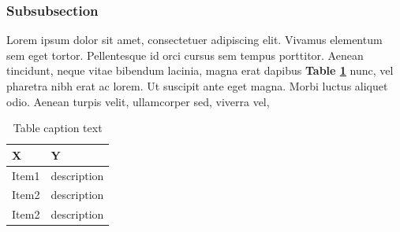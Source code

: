 \subsubsection{Subsubsection}
Lorem ipsum dolor sit amet, consectetuer adipiscing elit. Vivamus elementum sem eget tortor. Pellentesque id orci cursus sem tempus porttitor. Aenean tincidunt, neque vitae bibendum lacinia, magna erat dapibus \textbf{Table \ref{tab:table}} nunc, vel pharetra nibh erat ac lorem. Ut suscipit ante eget magna. Morbi luctus aliquet odio. Aenean turpis velit, ullamcorper sed, viverra vel, 

 \begin{table} [t] 
\centering
\begin{small}
\caption{Table caption text}
\label{tab:table}
\setlength{\tabcolsep}{1em}
\begin{tabular}{ l| p{8cm}}
\hline
 \textbf{X} & \textbf{ Y} \\
\hline
 \hline	
 Item1 & description\\
 \hline
  Item2 & description  \\
 \hline
  Item2 & description \\
 \hline
\end{tabular}
\end{small}
\end{table}
